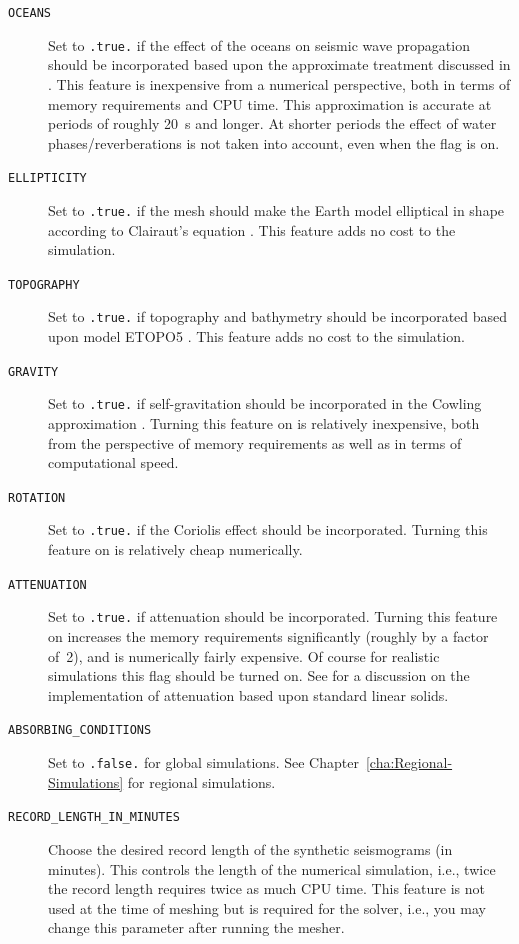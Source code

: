 \documentclass[oneside,english]{book}
\begin{document}
\begin{description}
\item [{\texttt{OCEANS}}] Set to \texttt{.true.} if the effect of the oceans
on seismic wave propagation should be incorporated based upon the
approximate treatment discussed in \citet{KoTr02b}. This feature
is inexpensive from a numerical perspective, both in terms of memory
requirements and CPU time. This approximation is accurate at periods
of roughly 20~s and longer. At shorter periods the effect of water
phases/reverberations is not taken into account, even when the flag
is on.
\item [{\texttt{ELLIPTICITY}}] Set to \texttt{.true.} if the mesh should
make the Earth model elliptical in shape according to Clairaut's equation
\citep{DaTr98}. This feature adds no cost to the simulation.
\item [{\texttt{TOPOGRAPHY}}] Set to \texttt{.true.} if topography and
bathymetry should be incorporated based upon model ETOPO5 \citep{Etopo5}.
This feature adds no cost to the simulation.
\item [{\texttt{GRAVITY}}] Set to \texttt{.true.} if self-gravitation should
be incorporated in the Cowling approximation \citep{KoTr02b,DaTr98}.
Turning this feature on is relatively inexpensive, both from the perspective
of memory requirements as well as in terms of computational speed.
\item [{\texttt{ROTATION}}] Set to \texttt{.true.} if the Coriolis effect
should be incorporated. Turning this feature on is relatively cheap
numerically.
\item [{\texttt{ATTENUATION}}] Set to \texttt{.true.} if attenuation should
be incorporated. Turning this feature on increases the memory requirements
significantly (roughly by a factor of~2), and is numerically fairly
expensive. Of course for realistic simulations this flag should be
turned on. See \citet{KoTr99,KoTr02a} for a discussion on the implementation
of attenuation based upon standard linear solids.
\item [{\texttt{ABSORBING\_CONDITIONS}}] Set to \texttt{.false.} for global
simulations. See Chapter~\ref{cha:Regional-Simulations} for regional
simulations.
\item [{\texttt{RECORD\_LENGTH\_IN\_MINUTES}}] Choose the desired record
length of the synthetic seismograms (in minutes). This controls the
length of the numerical simulation, i.e., twice the record length
requires twice as much CPU time. This feature is not used at the time
of meshing but is required for the solver, i.e., you may change this
parameter after running the mesher.

\end{description}
\end{document}
